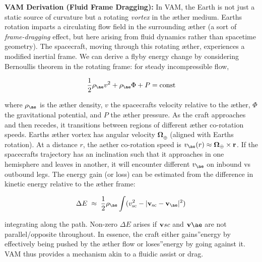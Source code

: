 \documentclass[a4paper, aps,preprint,superscriptaddress, 12pt]{revtex4}
\begin{document}
\textbf{VAM Derivation (Fluid Frame Dragging):} In VAM, the Earth is not just a static source of curvature but a rotating \textit{vortex} in the æther medium. Earth\rqs s rotation imparts a circulating flow field in the surrounding æther (a sort of \textit{frame-dragging} effect, but here arising from fluid dynamics rather than spacetime geometry). The spacecraft, moving through this rotating æther, experiences a modified inertial frame. We can derive a flyby energy change by considering Bernoulli\rqs s theorem in the rotating frame: for steady incompressible flow,

\begin{equation}
    \frac{1}{2}\rho_{\ae} v^2 + \rho_{\ae} \Phi + P = \text{const}
\end{equation}

where $\rho_{\ae}$ is the æther density, $v$ the spacecraft\rqs s velocity relative to the æther, $\Phi$ the gravitational potential, and $P$ the æther pressure. As the craft approaches and then recedes, it transitions between regions of different æther co-rotation speeds. Earth\rqs s æther vortex has angular velocity $\boldsymbol\Omega_{\oplus}$ (aligned with Earth\rqs s rotation). At a distance $r$, the aether co-rotation speed is $v_{\ae}(r)\approx \boldsymbol\Omega_{\oplus}\times \mathbf{r}$. If the spacecraft\rqs s trajectory has an inclination such that it approaches in one hemisphere and leaves in another, it will encounter different $v_{\ae}$ on inbound vs outbound legs. The energy gain (or loss) can be estimated from the difference in kinetic energy relative to the æther frame:

\begin{equation}
    \Delta E \;\approx\; \frac{1}{2} \rho_{\ae} \int (v_{\text{sc}}^2 - |\mathbf{v}_{\text{sc}}-\mathbf{v}_{\ae}|^2)\,
\end{equation}

integrating along the path. Non-zero $\Delta E$ arises if $\mathbf{v}\textit{\text{sc}}$ and $\mathbf{v}{\ae}$ are not parallel/opposite throughout. In essence, the craft either \grqq gains\textquotedblright energy by effectively being pushed by the æther flow or \grqq loses\textquotedblright energy by going against it. VAM thus provides a mechanism akin to a fluidic assist or drag.
\end{document}
